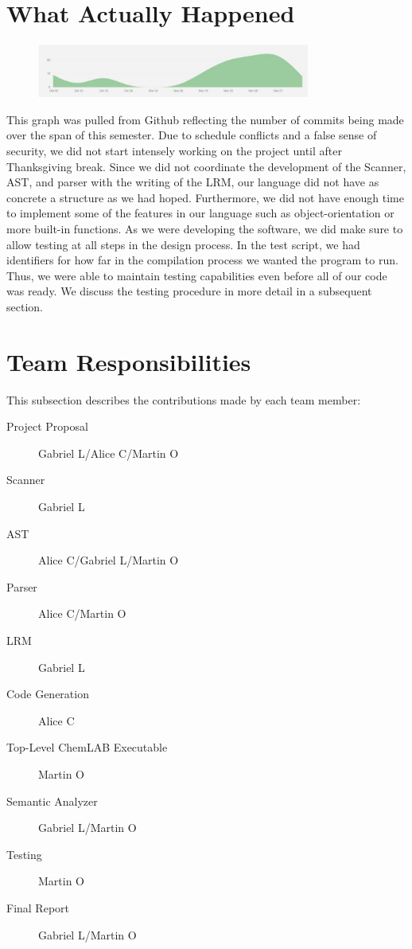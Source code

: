 \documentclass[11pt]{report}
\begin{document}
\section{What Actually Happened}
\begin{figure}[h]
 \centering
 \includegraphics[width=0.8\textwidth]{Github_Graph}
\end{figure}
This graph was pulled from Github reflecting the number of commits being made over the span of this semester. Due to schedule conflicts and a false sense of security, we did not start intensely working on the project until after Thanksgiving break. Since we did not coordinate the development of the Scanner, AST, and parser with the writing of the LRM, our language did not have as concrete a structure as we had hoped. Furthermore, we did not have enough time to implement some of the features in our language such as object-orientation or more built-in functions. As we were developing the software, we did make sure to allow testing at all steps in the design process. In the test script, we had identifiers for how far in the compilation process we wanted the program to run. Thus, we were able to maintain testing capabilities even before all of our code was ready. We discuss the testing procedure in more detail in a subsequent section. 
\section{Team Responsibilities}
This subsection describes the contributions made by each team member:
\begin{description}
\item[Project Proposal] Gabriel L/Alice C/Martin O
\item[Scanner] Gabriel L
\item[AST] Alice C/Gabriel L/Martin O
\item[Parser] Alice C/Martin O
\item[LRM] Gabriel L
\item[Code Generation] Alice C
\item[Top-Level ChemLAB Executable] Martin O
\item[Semantic Analyzer] Gabriel L/Martin O
\item[Testing] Martin O
\item[Final Report] Gabriel L/Martin O
\end{description}
\end{document}
